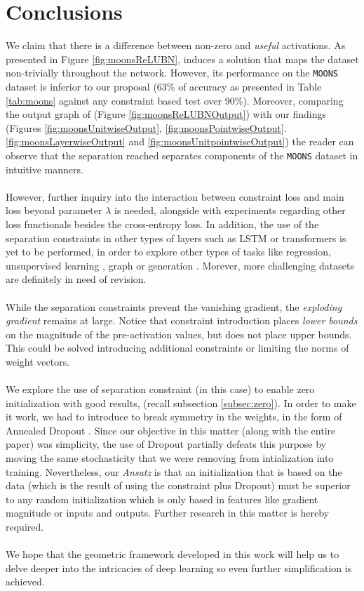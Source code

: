 \section{Conclusions}\label{sec:conclusions}

We claim that there is a difference between non-zero and \emph{useful} activations. As presented in Figure \ref{fig:moonsReLUBN}, \ReLUBN induces a solution that maps the dataset non-trivially throughout the network. However, its performance on the \texttt{MOONS} dataset is inferior to our proposal (63\% of accuracy as presented in Table \ref{tab:moons} against any constraint based test over 90\%). Moreover, comparing the output graph of \ReLUBN (Figure \ref{fig:moonsReLUBNOutput}) with our findings (Figures \ref{fig:moonsUnitwiseOutput}, \ref{fig:moonsPointwiseOutput}. \ref{fig:moonsLayerwiseOutput} and \ref{fig:moonsUnitpointwiseOutput}) the reader can observe that the separation reached separates components of the \texttt{MOONS} dataset in intuitive manners.  
\\\\
However, further inquiry into the interaction between constraint loss and main loss beyond parameter $\lambda$ is needed, alongside with experiments regarding other loss functionals besides the cross-entropy loss. In addition,  the use of the separation constraints in other types of layers such as LSTM \cite{lstm} or transformers \cite{transformer}\cite{transformer2} is yet to be performed, in order to explore other types of tasks like regression, unsupervised learning \cite{embedding}, graph \cite{graph} or generation \cite{gan,vae}. Morever, more challenging datasets are definitely in need of revision.
\\\\
While the separation constraints prevent the vanishing gradient, the \emph{exploding gradient} remains at large. Notice that constraint introduction places \emph{lower bounds} on the magnitude of the pre-activation values, but does not place upper bounds. This could be solved introducing additional constraints or limiting the norms of weight vectors. 
\\\\
We explore the use of separation constraint (\SepUnitPoint in this case) to enable zero initialization with good results, (recall subsection \ref{subsec:zero}). In order to make it work, we had to introduce to break symmetry in the weights, in the form of Annealed Dropout \cite{dropoutAnnealing}. Since our objective in this matter (along with the entire paper) was simplicity, the use of Dropout partially defeats this purpose by moving the same stochasticity that we were removing from intialization into training. Nevertheless, our \emph{Ansatz} is that an initialization that is based on the data (which is the result of using the constraint plus Dropout) must be superior to any random initialization which is only based in features like gradient magnitude or inputs and outputs. Further research in this matter is hereby required.
\\\\
We hope that the geometric framework developed in this work will help us to delve deeper into the intricacies of deep learning so even further simplification is achieved. 




